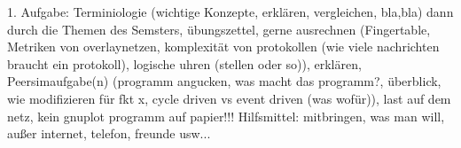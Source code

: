 \documentclass[ngerman,a4paper]{report}
\begin{document}




1. Aufgabe: Terminiologie (wichtige Konzepte, erklären, vergleichen, bla,bla)
dann durch die Themen des Semsters, übungszettel, gerne ausrechnen (Fingertable, Metriken von overlaynetzen, komplexität von protokollen (wie viele nachrichten braucht ein protokoll), logische uhren (stellen oder so)), erklären, Peersimaufgabe(n) (programm angucken, was macht das programm?, überblick, wie modifizieren für fkt x, cycle driven vs event driven (was wofür)), last auf dem netz, kein gnuplot programm auf papier!!!
Hilfsmittel: mitbringen, was man will, außer internet, telefon, freunde usw...
\end{document}
